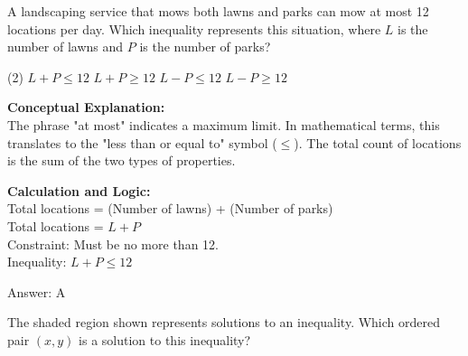 \documentclass[11pt,paper=a4,answers]{exam}
\begin{document}
\begin{questions}
\pointsinrightmargin
\pointsdroppedatright
\marksnotpoints
{}
\pointformat{\boldmath\themarginpoints}
\bracketedpoints




\question
A landscaping service that mows both lawns and parks can mow at most 12 locations per day. Which inequality represents this situation, where $L$ is the number of lawns and $P$ is the number of parks?
\begin{tasks}(2)
    \task $L + P \le 12$
    \task $L + P \ge 12$
    \task $L - P \le 12$
    \task $L - P \ge 12$
\end{tasks}

\begin{solution}
\textbf{Conceptual Explanation:} \\
The phrase "at most" indicates a maximum limit. In mathematical terms, this translates to the "less than or equal to" symbol ($\le$). The total count of locations is the sum of the two types of properties.

\vspace{10pt}
\textbf{Calculation and Logic:} \\
Total locations = (Number of lawns) + (Number of parks) \\
Total locations = $L + P$ \\
Constraint: Must be no more than 12. \\
Inequality: $L + P \le 12$

\vspace{15pt}
Answer: \colorbox{yellow!100}{A}
\end{solution}

\question
The shaded region shown represents solutions to an inequality. Which ordered pair $(x, y)$ is a solution to this inequality?

\begin{center}
\end{center}
\end{questions}
\end{document}
